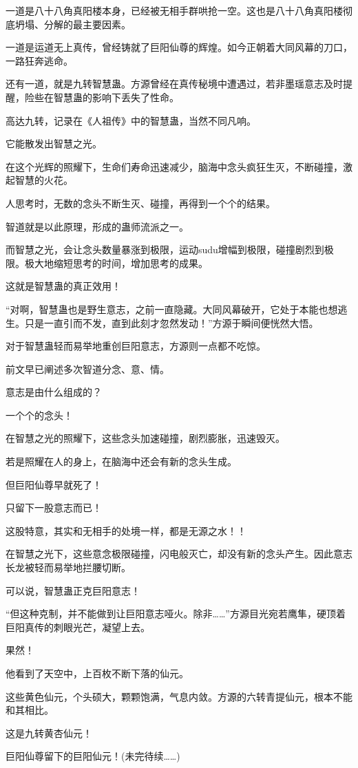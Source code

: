 \begin{this_body}
一道是八十八角真阳楼本身，已经被无相手群哄抢一空。这也是八十八角真阳楼彻底坍塌、分解的最主要因素。

一道是运道无上真传，曾经铸就了巨阳仙尊的辉煌。如今正朝着大同风幕的刀口，一路狂奔逃命。

还有一道，就是九转智慧蛊。方源曾经在真传秘境中遭遇过，若非墨瑶意志及时提醒，险些在智慧蛊的影响下丢失了性命。

高达九转，记录在《人祖传》中的智慧蛊，当然不同凡响。

它能散发出智慧之光。

在这个光辉的照耀下，生命们寿命迅速减少，脑海中念头疯狂生灭，不断碰撞，激起智慧的火花。

人思考时，无数的念头不断生灭、碰撞，再得到一个个的结果。

智道就是以此原理，形成的蛊师流派之一。

而智慧之光，会让念头数量暴涨到极限，运动sudu增幅到极限，碰撞剧烈到极限。极大地缩短思考的时间，增加思考的成果。

这就是智慧蛊的真正效用！

“对啊，智慧蛊也是野生意志，之前一直隐藏。大同风幕破开，它处于本能也想逃生。只是一直引而不发，直到此刻才忽然发动！”方源于瞬间便恍然大悟。

对于智慧蛊轻而易举地重创巨阳意志，方源则一点都不吃惊。

前文早已阐述多次智道分念、意、情。

意志是由什么组成的？

一个个的念头！

在智慧之光的照耀下，这些念头加速碰撞，剧烈膨胀，迅速毁灭。

若是照耀在人的身上，在脑海中还会有新的念头生成。

但巨阳仙尊早就死了！

只留下一股意志而已！

这股特意，其实和无相手的处境一样，都是无源之水！！

在智慧之光下，这些意念极限碰撞，闪电般灭亡，却没有新的念头产生。因此意志长龙被轻而易举地拦腰切断。

可以说，智慧蛊正克巨阳意志！

“但这种克制，并不能做到让巨阳意志哑火。除非……”方源目光宛若鹰隼，硬顶着巨阳真传的刺眼光芒，凝望上去。

果然！

他看到了天空中，上百枚不断下落的仙元。

这些黄色仙元，个头硕大，颗颗饱满，气息内敛。方源的六转青提仙元，根本不能和其相比。

这是九转黄杏仙元！

巨阳仙尊留下的巨阳仙元！(未完待续……)

\end{this_body}

